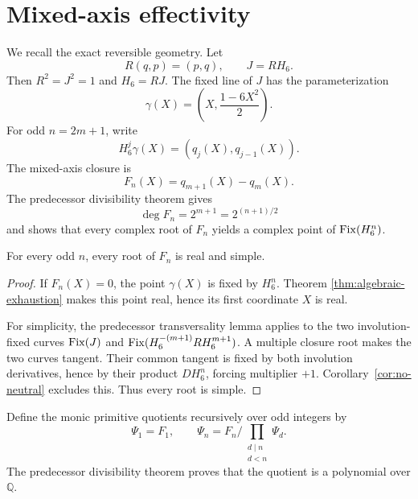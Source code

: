 \section{Mixed-axis effectivity}\label{sec:reflection}

We recall the exact reversible geometry.  Let
\[
R(q,p)=(p,q),\qquad J=R H_6.
\]
Then $R^2=J^2=1$ and $H_6=RJ$.  The fixed line of $J$ has the
parameterization
\begin{equation}\label{eq:gamma}
\gamma(X)=\left(X,\frac{1-6X^2}{2}\right).
\end{equation}
For odd $n=2m+1$, write
\[
H_6^j\gamma(X)=(q_j(X),q_{j-1}(X)).
\]
The mixed-axis closure is
\begin{equation}\label{eq:closure}
F_n(X)=q_{m+1}(X)-q_m(X).
\end{equation}
The predecessor divisibility theorem gives
\begin{equation}\label{eq:degree-closure}
\deg F_n=2^{m+1}=2^{(n+1)/2}
\end{equation}
and shows that every complex root of $F_n$ yields a complex point of
$\operatorname{Fix}(H_6^n)$.

\begin{theorem}\label{thm:closure-real}
For every odd $n$, every root of $F_n$ is real and simple.
\end{theorem}

\begin{proof}
If $F_n(X)=0$, the point $\gamma(X)$ is fixed by $H_6^n$.  Theorem
\ref{thm:algebraic-exhaustion} makes this point real, hence its first
coordinate $X$ is real.

For simplicity, the predecessor transversality lemma applies to the two
involution-fixed curves $\operatorname{Fix}(J)$ and
$\operatorname{Fix}(H_6^{-(m+1)}R H_6^{m+1})$.  A multiple closure root makes the two
curves tangent.  Their common tangent is fixed by both involution
derivatives, hence by their product $DH_6^n$, forcing multiplier $+1$.
Corollary~\ref{cor:no-neutral} excludes this.  Thus every root is simple.
\end{proof}

Define the monic primitive quotients recursively over odd integers by
\begin{equation}\label{eq:primitive-quotient}
\Psi_1=F_1,
\qquad
\Psi_n=F_n\bigg/\prod_{\substack{d\mid n\\d<n}}\Psi_d.
\end{equation}
The predecessor divisibility theorem proves that the quotient is a
polynomial over $\mathbb Q$.

